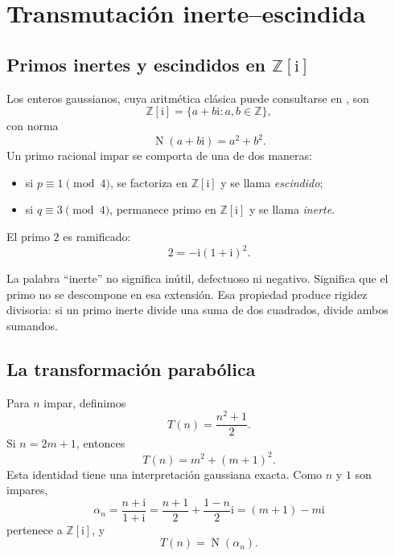 \documentclass[11pt,a4paper,openany]{report}
\newcommand{\Z}{\mathbb{Z}}
\newcommand{\Norm}{\operatorname{N}}
\newcommand{\ii}{\mathrm{i}}
\begin{document}
\chapter{Transmutación inerte--escindida}

\section{Primos inertes y escindidos en \(\Z[\ii]\)}

Los enteros gaussianos, cuya aritmética clásica puede consultarse en \cite{Cox,IrelandRosen}, son
\[
 \Z[\ii]=\{a+b\ii:a,b\in\Z\},
\]
con norma
\[
 \Norm(a+b\ii)=a^2+b^2.
\]
Un primo racional impar se comporta de una de dos maneras:
\begin{itemize}
\item si \(p\equiv1\pmod4\), se factoriza en \(\Z[\ii]\) y se llama \emph{escindido};
\item si \(q\equiv3\pmod4\), permanece primo en \(\Z[\ii]\) y se llama \emph{inerte}.
\end{itemize}
El primo \(2\) es ramificado:
\[
 2=-\ii(1+\ii)^2.
\]

La palabra ``inerte'' no significa inútil, defectuoso ni negativo. Significa que el primo no se descompone en esa extensión. Esa propiedad produce rigidez divisoria: si un primo inerte divide una suma de dos cuadrados, divide ambos sumandos.

\section{La transformación parabólica}

Para \(n\) impar, definimos
\begin{equation}
 \boxed{T(n)=\frac{n^2+1}{2}.}
 \label{eq:Tn}
\end{equation}
Si \(n=2m+1\), entonces
\begin{equation}
 T(n)=m^2+(m+1)^2.
 \label{eq:T-consecutive}
\end{equation}
Esta identidad tiene una interpretación gaussiana exacta. Como \(n\) y \(1\) son impares,
\[
 \alpha_n=\frac{n+\ii}{1+\ii}
 =\frac{n+1}{2}+\frac{1-n}{2}\ii
 =(m+1)-m\ii
\]
pertenece a \(\Z[\ii]\), y
\begin{equation}
 \boxed{T(n)=\Norm(\alpha_n).}
 \label{eq:Tnorm}
\end{equation}
\end{document}
